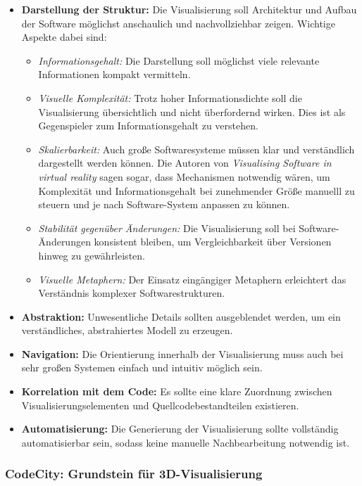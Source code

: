 \begin{itemize}
    \item \textbf{Darstellung der Struktur:} Die Visualisierung soll Architektur und Aufbau der Software möglichst anschaulich und nachvollziehbar zeigen. Wichtige Aspekte dabei sind:
    \begin{itemize}
        \item \emph{Informationsgehalt:} Die Darstellung soll möglichst viele relevante Informationen kompakt vermitteln.
        \item \emph{Visuelle Komplexität:} Trotz hoher Informationsdichte soll die Visualisierung übersichtlich und nicht überfordernd wirken. Dies ist als Gegenspieler zum Informationsgehalt zu verstehen.
        \item \emph{Skalierbarkeit:} Auch große Softwaresysteme müssen klar und verständlich dargestellt werden können. Die Autoren von \textit{Visualising Software in virtual reality} \cite{visSoftwareVR} sagen sogar, dass Mechanismen notwendig wären, um Komplexität und Informationsgehalt bei zunehmender Größe manuelll zu steuern und je nach Software-System anpassen zu können.
        \item \emph{Stabilität gegenüber Änderungen:} Die Visualisierung soll bei Software-Änderungen konsistent bleiben, um Vergleichbarkeit über Versionen hinweg zu gewährleisten.
        \item \emph{Visuelle Metaphern:} Der Einsatz eingängiger Metaphern erleichtert das Verständnis komplexer Softwarestrukturen.
    \end{itemize}
    \item \textbf{Abstraktion:} Unwesentliche Details sollten ausgeblendet werden, um ein verständliches, abstrahiertes Modell zu erzeugen.
    \item \textbf{Navigation:} Die Orientierung innerhalb der Visualisierung muss auch bei sehr großen Systemen einfach und intuitiv möglich sein.
    \item \textbf{Korrelation mit dem Code:} Es sollte eine klare Zuordnung zwischen Visualisierungselementen und Quellcodebestandteilen existieren.
    \item \textbf{Automatisierung:} Die Generierung der Visualisierung sollte vollständig automatisierbar sein, sodass keine manuelle Nachbearbeitung notwendig ist.
\end{itemize}

\subsubsection{CodeCity: Grundstein für 3D-Visualisierung}
\label{sec:CodeCity}

